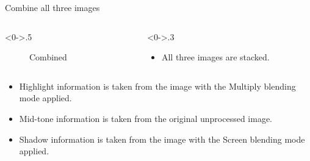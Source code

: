 \documentclass{beamer}
\begin{document}
		\begin{frame}{Combine all three images}
 
		\begin{columns}[T]
			\begin{column}<0->{.5\textwidth}
				\begin{figure}[thpb]
					\centering
					\caption{Combined}
					\label{fig:1}
				\end{figure}
			\end{column}%
			\hfill%
			\begin{column}<0->{.3\textwidth}
				\centering
			    \begin{itemize} 
			    \item 
			    All three images are stacked.
			    \end{itemize}
		   
			\end{column}
		\end{columns}
	\end{frame}
	
	\begin{frame}
			    \begin{itemize} 
			    
			     \item 
			    Highlight information is taken from the image with the Multiply blending mode applied. 
			    \item 
			    Mid-tone information is taken from the original unprocessed image.
			    \item
			    Shadow information is taken from the image with the Screen blending mode applied. 
			    \end{itemize}
			    \end{frame}
\end{document}
